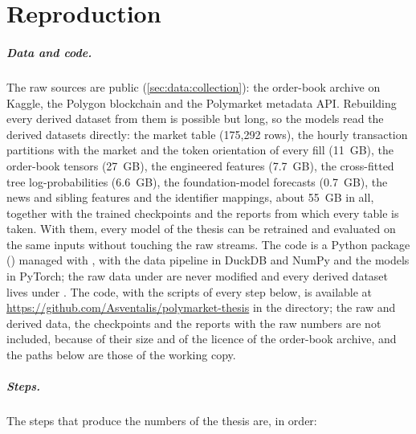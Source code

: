 \chapter{Reproduction}
\label{app:reproduction}

\paragraph{Data and code.}  The raw sources are public
(\cref{sec:data:collection}): the order-book archive on Kaggle, the Polygon blockchain and
the Polymarket metadata API.  Rebuilding every derived dataset from them is possible but
long, so the models read the derived datasets directly: the market table
(175{,}292 rows), the hourly transaction partitions with the market and the token
orientation of every fill (11~GB), the order-book tensors (27~GB), the engineered features
(7.7~GB), the cross-fitted tree log-probabilities (6.6~GB), the foundation-model forecasts
(0.7~GB), the news and sibling features and the identifier mappings, about 55~GB in all,
together with the trained checkpoints and the reports from which every table is taken.
With them, every model of the thesis can be retrained and evaluated on the same inputs
without touching the raw streams.  The code is
a Python package () managed with , with the data pipeline in
DuckDB and NumPy and the models in PyTorch; the raw data
under  are never modified and every derived dataset lives under
.  The code, with the scripts of every step below, is available at
\url{https://github.com/Asventalis/polymarket-thesis} in the  directory; the
raw and derived data, the checkpoints and the reports with the raw numbers are not
included, because of their size and of the licence of the order-book archive, and the paths
below are those of the working copy.

\paragraph{Steps.}  The steps that produce the numbers of the thesis are, in order:

